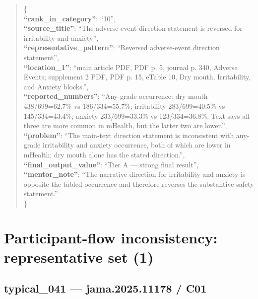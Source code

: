 \documentclass[
  letterpaper,
  9pt]{extreport}
\begin{document}
\begin{quote}
\{\\
\textbf{``rank\_in\_category''}: ``10'',\\
\textbf{``source\_title''}: ``The adverse-event direction statement is
reversed for irritability and anxiety'',\\
\textbf{``representative\_pattern''}: ``Reversed adverse-event direction
statement'',\\
\textbf{``location\_1''}: ``main article PDF, PDF p. 5, journal p. 340,
Adverse Events; supplement 2 PDF, PDF p. 15, eTable 10, Dry mouth,
Irritability, and Anxiety blocks.'',\\
\textbf{``reported\_numbers''}: ``Any-grade occurrence: dry mouth
438/699=62.7\% vs 186/334=55.7\%; irritability 283/699=40.5\% vs
145/334=43.4\%; anxiety 233/699=33.3\% vs 123/334=36.8\%. Text says all
three are more common in mHealth, but the latter two are lower.'',\\
\textbf{``problem''}: ``The main-text direction statement is
inconsistent with any-grade irritability and anxiety occurrence, both of
which are lower in mHealth; dry mouth alone has the stated
direction.'',\\
\textbf{``final\_output\_value''}: ``Tier A --- strong final result'',\\
\textbf{``mentor\_note''}: ``The narrative direction for irritability
and anxiety is opposite the tabled occurrence and therefore reverses the
substantive safety statement.''\\
\}
\end{quote}

\hypertarget{participant-flow-inconsistency-representative-set-1}{%
\section{Participant-flow inconsistency: representative set
(1)}\label{participant-flow-inconsistency-representative-set-1}}

\hypertarget{typical_041--jama202511178--c01}{%
\subsection{typical\_041 --- jama.2025.11178 /
C01}\label{typical_041--jama202511178--c01}}
\end{document}
